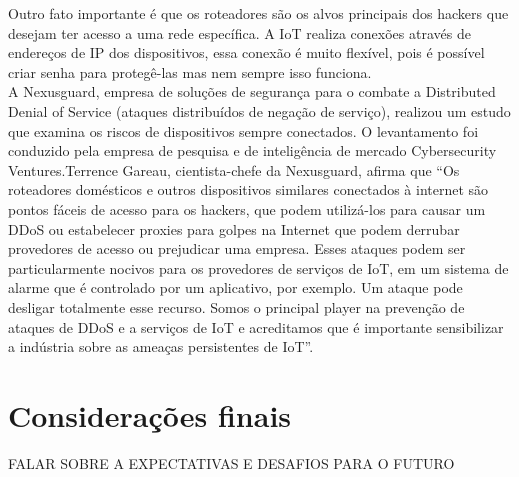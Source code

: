 \documentclass[11pt]{classe_cn}                 %
\begin{document}
Outro fato importante é que os roteadores são os alvos principais dos 
hackers que desejam ter acesso a uma rede específica. A IoT realiza 
conexões através de endereços de IP dos dispositivos,  essa conexão é 
muito flexível, pois é possível criar senha para protegê-las mas nem 
sempre isso funciona.\\

A Nexusguard, empresa de soluções de segurança para o combate a 
Distributed Denial of Service (ataques distribuídos de negação de 
serviço), realizou um estudo que examina os riscos de dispositivos 
sempre conectados. O levantamento foi conduzido pela empresa de pesquisa 
e de inteligência de mercado Cybersecurity Ventures.Terrence Gareau, 
cientista-chefe da Nexusguard, afirma que “Os roteadores domésticos e 
outros dispositivos similares conectados à internet são pontos fáceis 
de acesso para os hackers, que podem utilizá-los para causar um DDoS ou 
estabelecer proxies para golpes na Internet que podem derrubar provedores 
de acesso ou prejudicar uma empresa. Esses ataques podem ser particularmente 
nocivos para os provedores de serviços de IoT, em um sistema de alarme 
que é controlado por um aplicativo, por exemplo. Um ataque pode desligar 
totalmente esse recurso. Somos o principal player na prevenção de 
ataques de DDoS e a serviços de IoT e acreditamos que é importante 
sensibilizar a indústria sobre as ameaças persistentes de IoT”.

\section{Considerações finais}
FALAR SOBRE A EXPECTATIVAS E DESAFIOS PARA O FUTURO




\vspace{1.0cm}





\end{document}
